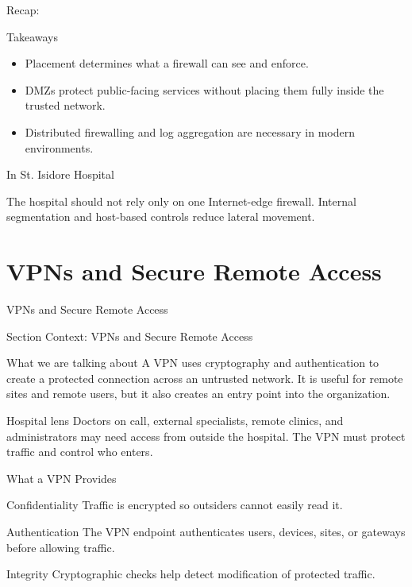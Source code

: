 \documentclass[presentation]{beamer}
\newcommand{\sectiontitleframe}[1]{
\begin{frame}[plain,c]
\begin{center}
{\usebeamerfont{title}\usebeamercolor[fg]{title}#1}
\end{center}
\end{frame}
}
\newcommand{\scenario}{St. Isidore Hospital}
\newcommand{\takeawaysframe}[2]{
\begin{frame}[c]{Recap: \insertsection}
\begin{block}{Takeaways}
#1
\end{block}
\begin{exampleblock}{In \scenario}
#2
\end{exampleblock}
\end{frame}
}
\begin{document}
\takeawaysframe{
\begin{itemize}
    \item Placement determines what a firewall can see and enforce.
    \item DMZs protect public-facing services without placing them fully inside the trusted network.
    \item Distributed firewalling and log aggregation are necessary in modern environments.
\end{itemize}
}{
The hospital should not rely only on one Internet-edge firewall. Internal segmentation and host-based
controls reduce lateral movement.
}

\section{VPNs and Secure Remote Access}
\sectiontitleframe{VPNs and Secure Remote Access}

\begin{frame}[c]{Section Context: VPNs and Secure Remote Access}
\begin{block}{What we are talking about}
A VPN uses cryptography and authentication to create a protected connection across an untrusted
network. It is useful for remote sites and remote users, but it also creates an entry point into the
organization.
\end{block}

\begin{exampleblock}{Hospital lens}
Doctors on call, external specialists, remote clinics, and administrators may need access from
outside the hospital. The VPN must protect traffic and control who enters.
\end{exampleblock}
\end{frame}

\begin{frame}[c]{What a VPN Provides}
\begin{block}{Confidentiality}
Traffic is encrypted so outsiders cannot easily read it.
\end{block}

\begin{block}{Authentication}
The VPN endpoint authenticates users, devices, sites, or gateways before allowing traffic.
\end{block}

\begin{block}{Integrity}
Cryptographic checks help detect modification of protected traffic.
\end{block}
\end{frame}
\end{document}
